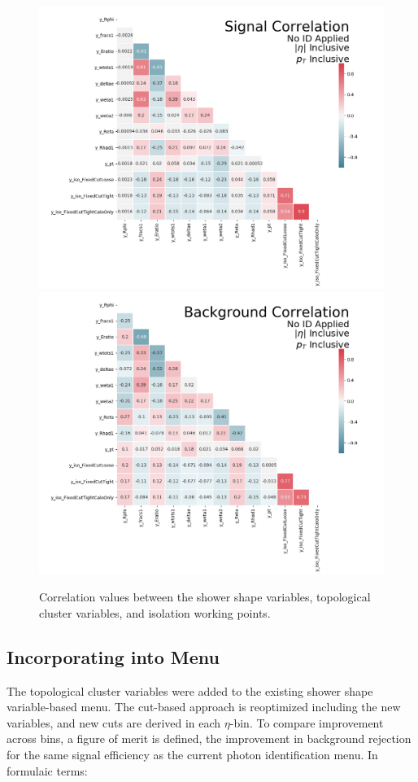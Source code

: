 \begin{figure}[!thp]
    \centering
    \includegraphics[width=.77\textwidth]{chapters/chapter4_photonID/images/sig_none_corr.png}
    \includegraphics[width=.77\textwidth]{chapters/chapter4_photonID/images/bkg_none_corr.png}
    \caption{Correlation values between the shower shape variables, topological cluster variables, and isolation working points.}
    \label{fig:photonid-corrs}
\end{figure}

\subsection{Incorporating into Menu}

The topological cluster variables were added to the existing shower shape variable-based menu. The cut-based approach is reoptimized including the new variables, and new cuts are derived in each $\eta$-\pt bin. To compare improvement across bins, a figure of merit is defined, the improvement in background rejection for the same signal efficiency as the current photon identification menu. In formulaic terms:

